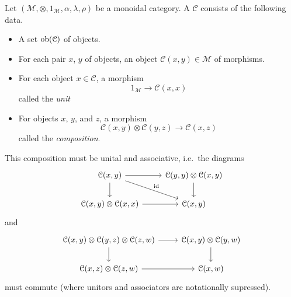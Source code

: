 \documentclass[main.tex]{subfiles}
\begin{document}
\begin{definition}
  \label{def:enriched_category}
  Let $(\mathcal{M}, \otimes, 1_{\mathcal{M}}, \alpha, \lambda, \rho)$ be a monoidal category. A  $\mathcal{C}$ consists of the following data.
  \begin{itemize}
    \item A set $\operatorname{\mathrm{ob}}(\mathcal{C})$ of objects.

    \item For each pair $x$, $y$ of objects, an object $\mathcal{C}(x, y) \in \mathcal{M}$ of morphisms.

    \item For each object $x \in \mathcal{C}$, a morphism
      \begin{equation*}
        1_{\mathcal{M}} \to \mathcal{C}(x, x)
      \end{equation*}
      called the \emph{unit}

    \item For objects $x$, $y$, and $z$, a morphism
      \begin{equation*}
        \mathcal{C}(x, y) \otimes \mathcal{C}(y, z) \to \mathcal{C}(x, z)
      \end{equation*}
      called the \emph{composition}.
  \end{itemize}
  This composition must be unital and associative, i.e.\ the diagrams
  \begin{equation*}
    \begin{tikzcd}
      \mathcal{C}(x, y)
      \arrow[r]
      \arrow[d]
      \arrow[rd, "\id"]
      & \mathcal{C}(y, y) \otimes \mathcal{C}(x, y)
      \arrow[d]
      \\
      \mathcal{C}(x, y) \otimes \mathcal{C}(x, x)
      \arrow[r]
      & \mathcal{C}(x, y)
    \end{tikzcd}
  \end{equation*}
  and
  \begin{equation*}
    \begin{tikzcd}
      \mathcal{C}(x, y) \otimes \mathcal{C}(y, z) \otimes \mathcal{C}(z, w)
      \arrow[r]
      \arrow[d]
      & \mathcal{C}(x, y) \otimes \mathcal{C}(y, w)
      \arrow[d]
      \\
      \mathcal{C}(x, z) \otimes \mathcal{C}(z, w)
      \arrow[r]
      & \mathcal{C}(x, w)
    \end{tikzcd}
  \end{equation*}
  must commute (where unitors and associators are notationally supressed).
\end{definition}
\end{document}
